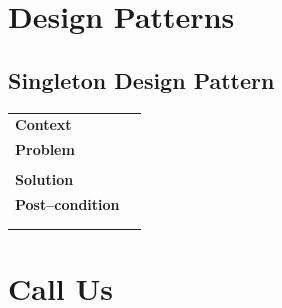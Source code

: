 \documentclass{article}
\begin{document}
\newpage


\section{Design Patterns}

\subsection{Singleton Design Pattern}
    \begin{tabular}{ l | l }
    \toprule
      \rowcolor{LightCyan}
      \textbf{Context}            & \textit{}\\
      \textbf{Problem}            & \textit{}\\
                                  & \textit{}\\
      \rowcolor{LightCyan}
      \textbf{Solution}           & \textit{}\\
      \textbf{Post--condition}    & \textit{}\\
                                  & \textit{}\\
                                  & \textit{}\\
    \toprule
    \end{tabular}

\begin{figure}[ht!]
\centering
\end{figure}






\section{Call Us}
\end{document}
